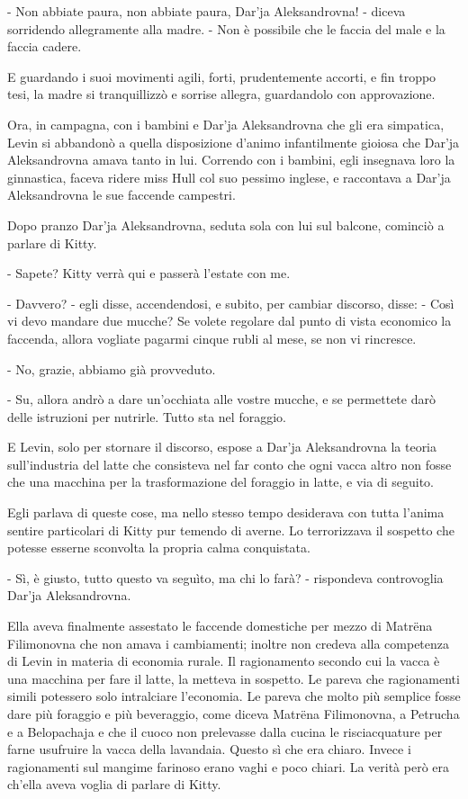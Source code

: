 - Non abbiate paura, non abbiate paura, Dar'ja Aleksandrovna! - diceva sorridendo allegramente alla madre. - Non è possibile che le faccia del male e la faccia cadere. 

E guardando i suoi movimenti agili, forti, prudentemente accorti, e fin troppo tesi, la madre si tranquillizzò e sorrise allegra, guardandolo con approvazione. 

Ora, in campagna, con i bambini e Dar'ja Aleksandrovna che gli era simpatica, Levin si abbandonò a quella disposizione d'animo infantilmente gioiosa che Dar'ja Aleksandrovna amava tanto in lui. Correndo con i bambini, egli insegnava loro la ginnastica, faceva ridere miss Hull col suo pessimo inglese, e raccontava a Dar'ja Aleksandrovna le sue faccende campestri. 

Dopo pranzo Dar'ja Aleksandrovna, seduta sola con lui sul balcone, cominciò a parlare di Kitty. 

- Sapete? Kitty verrà qui e passerà l'estate con me. 

- Davvero? - egli disse, accendendosi, e subito, per cambiar discorso, disse: - Così vi devo mandare due mucche? Se volete regolare dal punto di vista economico la faccenda, allora vogliate pagarmi cinque rubli al mese, se non vi rincresce. 

- No, grazie, abbiamo già provveduto. 

- Su, allora andrò a dare un'occhiata alle vostre mucche, e se permettete darò delle istruzioni per nutrirle. Tutto sta nel foraggio. 

E Levin, solo per stornare il discorso, espose a Dar'ja Aleksandrovna la teoria sull'industria del latte che consisteva nel far conto che ogni vacca altro non fosse che una macchina per la trasformazione del foraggio in latte, e via di seguito. 

Egli parlava di queste cose, ma nello stesso tempo desiderava con tutta l'anima sentire particolari di Kitty pur temendo di averne. Lo terrorizzava il sospetto che potesse esserne sconvolta la propria calma conquistata. 

- Sì, è giusto, tutto questo va seguìto, ma chi lo farà? - rispondeva controvoglia Dar'ja Aleksandrovna. 

Ella aveva finalmente assestato le faccende domestiche per mezzo di Matrëna Filimonovna che non amava i cambiamenti; inoltre non credeva alla competenza di Levin in materia di economia rurale. Il ragionamento secondo cui la vacca è una macchina per fare il latte, la metteva in sospetto. Le pareva che ragionamenti simili potessero solo intralciare l'economia. Le pareva che molto più semplice fosse dare più foraggio e più beveraggio, come diceva Matrëna Filimonovna, a Petrucha e a Belopachaja e che il cuoco non prelevasse dalla cucina le risciacquature per farne usufruire la vacca della lavandaia. Questo sì che era chiaro. Invece i ragionamenti sul mangime farinoso erano vaghi e poco chiari. La verità però era ch'ella aveva voglia di parlare di Kitty. 
\enlargethispage*{1\baselineskip}


